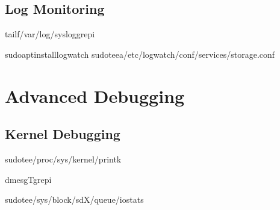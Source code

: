 \documentclass[letterpaper,10pt,english]{sphinxmanual}
\begin{document}
\subsection{Log Monitoring}
\label{\detokenize{troubleshooting:log-monitoring}}
\begin{sphinxVerbatim}[commandchars=\\\{\}]
tail\PYGZhy{}f/var/log/sysloggrep\PYGZhy{}i

sudoaptinstalllogwatch
sudotee\PYGZhy{}a/etc/logwatch/conf/services/storage.conf
\end{sphinxVerbatim}


\section{Advanced Debugging}
\label{\detokenize{troubleshooting:advanced-debugging}}

\subsection{Kernel Debugging}
\label{\detokenize{troubleshooting:kernel-debugging}}
\begin{sphinxVerbatim}[commandchars=\\\{\}]
sudotee/proc/sys/kernel/printk

dmesg\PYGZhy{}Tgrep\PYGZhy{}i

sudotee/sys/block/sdX/queue/iostats
\end{sphinxVerbatim}
\end{document}
